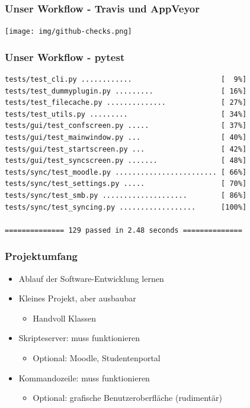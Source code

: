\documentclass{beamer}
\begin{document}
	\begin{frame}
	\frametitle{Unser Workflow - Travis und AppVeyor}
	\texttt{[image: img/github-checks.png]}
	\end{frame}

	\begin{frame}[fragile]
	\frametitle{Unser Workflow - pytest}
  \begin{verbatim}
tests/test_cli.py ............                     [  9%]
tests/test_dummyplugin.py .........                [ 16%]
tests/test_filecache.py ..............             [ 27%]
tests/test_utils.py .........                      [ 34%]
tests/gui/test_confscreen.py .....                 [ 37%]
tests/gui/test_mainwindow.py ...                   [ 40%]
tests/gui/test_startscreen.py ...                  [ 42%]
tests/gui/test_syncscreen.py .......               [ 48%]
tests/sync/test_moodle.py ........................ [ 66%]
tests/sync/test_settings.py .....                  [ 70%]
tests/sync/test_smb.py ....................        [ 86%]
tests/sync/test_syncing.py ..................      [100%]

============== 129 passed in 2.48 seconds ==============
  \end{verbatim}
\end{frame}

	
	\begin{frame}
	\frametitle{Projektumfang}
	\begin{itemize}
		\item Ablauf der Software-Entwicklung lernen
		\item Kleines Projekt, aber ausbaubar
			\begin{itemize}
				\item Handvoll Klassen
			\end{itemize}
		\pause
		\item Skripteserver: muss funktionieren
			\begin{itemize}
				\item Optional: Moodle, Studentenportal
			\end{itemize}
		\item Kommandozeile: muss funktionieren
			\begin{itemize}
				\item Optional: grafische Benutzeroberfläche (rudimentär)
			\end{itemize}
	\end{itemize}
	\end{frame}
	
\end{document}
